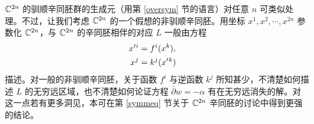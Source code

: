 ${\mathbb C}^{2n}$ 的驯顺辛同胚群的生成元（用第 \ref{oversym} 节的语言）对任意 $n$ 可类似处理。不过，让我们考虑 ${\mathbb C}^{2n}$ 的一个假想的非驯顺辛同胚。用坐标 $x^1,x^2,\cdots,x^{2n}$ 参数化 ${\mathbb C}^{2n}$，与 ${\mathbb C}^{2n}$ 的辛同胚相伴的对应 $L$ 一般由方程
\begin{align}\label{expfno}x'{}^i&=f^i(x^k),\cr x^j&=k^j(x'{}^k)\end{align}
描述。对一般的非驯顺辛同胚，关于函数 $f^i$ 与逆函数 $k^j$ 所知甚少，不清楚如何描述 $L$ 的无穷远区域，也不清楚如何论证方程 $\bar\partial w=-\alpha$ 有在无穷远消失的解。对这一点若有更多洞见，本可在第 \ref{symmeq} 节关于 ${\mathbb C}^{2n}$ 辛同胚的讨论中得到更强的结论。
